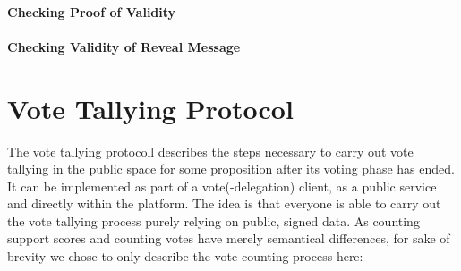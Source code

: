 \paragraph{Checking Proof of Validity}
%
%
%

\paragraph{Checking Validity of Reveal Message}


\section{Vote Tallying Protocol}
\label{sec:VoteTallyingProtocol}
The vote tallying protocoll describes the steps necessary to carry out vote tallying in the public space for some proposition after its voting phase has ended.
It can be implemented as part of a vote(-delegation) client, as a public service and directly within the platform.
The idea is that everyone is able to carry out the vote tallying process purely relying on public, signed data.
As counting support scores and counting votes have merely semantical differences, for sake of brevity we chose to only describe the vote counting process here:

